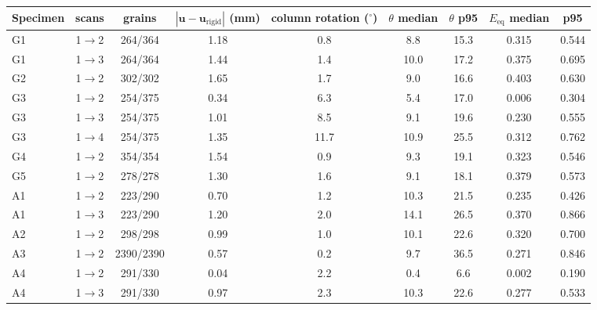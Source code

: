 \begin{tabular}{lcccccccc}
\toprule
Specimen & scans & grains & $|\mathbf{u}-\mathbf{u}_\mathrm{rigid}|$ (mm) & column rotation ($^\circ$) & $\theta$ median & $\theta$ p95 & $E_\mathrm{eq}$ median & p95 \\
\midrule
G1 & 1$\to$2 & 264/364 & 1.18 & 0.8 & 8.8 & 15.3 & 0.315 & 0.544 \\
G1 & 1$\to$3 & 264/364 & 1.44 & 1.4 & 10.0 & 17.2 & 0.375 & 0.695 \\
G2 & 1$\to$2 & 302/302 & 1.65 & 1.7 & 9.0 & 16.6 & 0.403 & 0.630 \\
G3 & 1$\to$2 & 254/375 & 0.34 & 6.3 & 5.4 & 17.0 & 0.006 & 0.304 \\
G3 & 1$\to$3 & 254/375 & 1.01 & 8.5 & 9.1 & 19.6 & 0.230 & 0.555 \\
G3 & 1$\to$4 & 254/375 & 1.35 & 11.7 & 10.9 & 25.5 & 0.312 & 0.762 \\
G4 & 1$\to$2 & 354/354 & 1.54 & 0.9 & 9.3 & 19.1 & 0.323 & 0.546 \\
G5 & 1$\to$2 & 278/278 & 1.30 & 1.6 & 9.1 & 18.1 & 0.379 & 0.573 \\
A1 & 1$\to$2 & 223/290 & 0.70 & 1.2 & 10.3 & 21.5 & 0.235 & 0.426 \\
A1 & 1$\to$3 & 223/290 & 1.20 & 2.0 & 14.1 & 26.5 & 0.370 & 0.866 \\
A2 & 1$\to$2 & 298/298 & 0.99 & 1.0 & 10.1 & 22.6 & 0.320 & 0.700 \\
A3 & 1$\to$2 & 2390/2390 & 0.57 & 0.2 & 9.7 & 36.5 & 0.271 & 0.846 \\
A4 & 1$\to$2 & 291/330 & 0.04 & 2.2 & 0.4 & 6.6 & 0.002 & 0.190 \\
A4 & 1$\to$3 & 291/330 & 0.97 & 2.3 & 10.3 & 22.6 & 0.277 & 0.533 \\
\bottomrule
\end{tabular}
